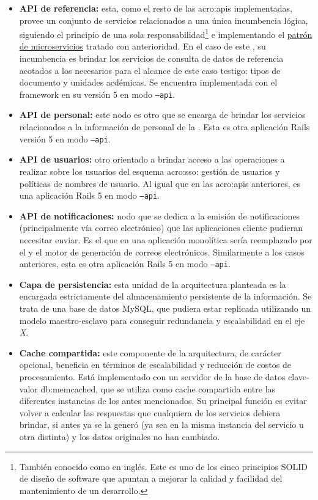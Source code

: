 \begin{itemize}
  \item \textbf{API de referencia:} esta, como el resto de las \glspl{acro:api} implementadas, provee un conjunto de servicios relacionados a una única incumbencia lógica, siguiendo el principio de una sola responsabilidad\footnote{También conocido como  en inglés. Este es uno de los cinco principios SOLID de diseño de software que apuntan a mejorar la calidad y facilidad del mantenimiento de un desarrollo.} e implementando el \hyperref[microservicios]{patrón de microservicios} tratado con anterioridad. En el caso de este , su incumbencia es brindar los servicios de consulta de datos de referencia acotados a los necesarios para el alcance de este caso testigo: tipos de documento y unidades acdémicas. Se encuentra implementada con el framework  en su versión 5 en modo \texttt{--api}.

  \item \textbf{API de personal:} este nodo es otro  que se encarga de brindar los servicios relacionados a la información de personal de la {\unlp}. Esta es otra aplicación Rails versión 5 en modo \texttt{--api}.

  \item \textbf{API de usuarios:} otro  orientado a brindar acceso a las operaciones a realizar sobre los usuarios del esquema \gls{acro:sso}: gestión de usuarios y políticas de nombres de usuario. Al igual que en las \glspl{acro:api} anteriores, es una aplicación Rails 5 en modo \texttt{--api}.

  \item \textbf{API de notificaciones:} nodo que se dedica a la emisión de notificaciones (principalmente vía correo electrónico) que las aplicaciones cliente pudieran necesitar enviar. Es el  que en una aplicación monolítica sería reemplazado por el  y el motor de generación de correos electrónicos. Similarmente a los casos anteriores, esta es otra aplicación Rails 5 en modo \texttt{--api}.

  \item \textbf{Capa de persistencia:} esta unidad de la arquitectura planteada es la encargada estrictamente del almacenamiento persistente de la información. Se trata de una base de datos MySQL, que pudiera estar replicada utilizando un modelo maestro-esclavo para conseguir redundancia y escalabilidad en el eje \textit{X}.

  \item \textbf{Cache compartida:} este componente de la arquitectura, de carácter opcional, beneficia en términos de escalabilidad y reducción de costos de procesamiento. Está implementado con un servidor de la base de datos clave-valor \gls{db:memcached}, que se utiliza como cache compartida entre las diferentes instancias de los  antes mencionados. Su principal función es evitar volver a calcular las respuestas que cualquiera de los servicios debiera brindar, si antes ya se la generó (ya sea en la misma instancia del servicio u otra distinta) y los datos originales no han cambiado.
\end{itemize}

